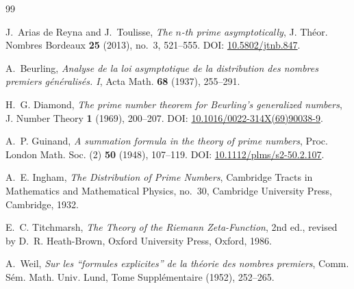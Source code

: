 \documentclass[11pt]{amsart}
\numberwithin{equation}{section}
\theoremstyle{plain}
\theoremstyle{definition}
\theoremstyle{remark}
\begin{document}
\begin{thebibliography}{99}

J.~Arias de Reyna and J.~Toulisse,
\emph{The $n$-th prime asymptotically},
J. Th\'eor. Nombres Bordeaux \textbf{25} (2013), no.~3, 521--555.
DOI: \href{https://doi.org/10.5802/jtnb.847}{10.5802/jtnb.847}.

A.~Beurling,
\emph{Analyse de la loi asymptotique de la distribution des nombres
premiers g\'en\'eralis\'es. I},
Acta Math. \textbf{68} (1937), 255--291.

H.~G. Diamond,
\emph{The prime number theorem for Beurling's generalized numbers},
J. Number Theory \textbf{1} (1969), 200--207.
DOI: \href{https://doi.org/10.1016/0022-314X(69)90038-9}{10.1016/0022-314X(69)90038-9}.

A.~P. Guinand,
\emph{A summation formula in the theory of prime numbers},
Proc. London Math. Soc. (2) \textbf{50} (1948), 107--119.
DOI: \href{https://doi.org/10.1112/plms/s2-50.2.107}{10.1112/plms/s2-50.2.107}.

A.~E. Ingham,
\emph{The Distribution of Prime Numbers},
Cambridge Tracts in Mathematics and Mathematical Physics, no.~30,
Cambridge University Press, Cambridge, 1932.

E.~C. Titchmarsh,
\emph{The Theory of the Riemann Zeta-Function},
2nd ed., revised by D.~R. Heath-Brown,
Oxford University Press, Oxford, 1986.

A.~Weil,
\emph{Sur les ``formules explicites'' de la th\'eorie des nombres premiers},
Comm. S\'em. Math. Univ. Lund, Tome Suppl\'ementaire (1952), 252--265.

\end{thebibliography}
\end{document}
